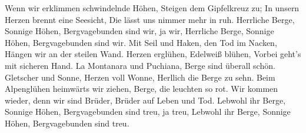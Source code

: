 \beginverse
Wenn wir erklimmen schwindelnde Höhen,
Steigen dem Gipfelkreuz zu;
In unsern Herzen brennt eine Seesicht,
Die lässt uns nimmer mehr in ruh. 
\endverse
\beginchorus
Herrliche Berge, Sonnige Höhen,
Bergvagebunden sind wir, ja wir,
Herrliche Berge, Sonnige Höhen,
Bergvagebunden sind wir.
\endchorus
\beginverse
Mit Seil und Haken, den Tod im Nacken,
Hängen wir an der steilen Wand. 
Herzen erglühen, Edelweiß blühen,
Vorbei geht’s mit sicheren Hand.
\endverse
\beginverse
La Montanara und Puchiana,
Berge sind überall schön.
Gletscher und Sonne, Herzen voll Wonne,
Herllich die Berge zu sehn.
\endverse
\beginverse
Beim Alpenglühen heimwärts wir ziehen,
Berge, die leuchten so rot. 
Wir kommen wieder, denn wir sind Brüder,
Brüder auf Leben und Tod.
\endverse
\beginchorus
Lebwohl ihr Berge,
Sonnige Höhen,
Bergvagebunden sind treu, ja treu,
Lebwohl ihr Berge, Sonnige Höhen,
Bergvagebunden sind treu. 
\endchorus
\endsong